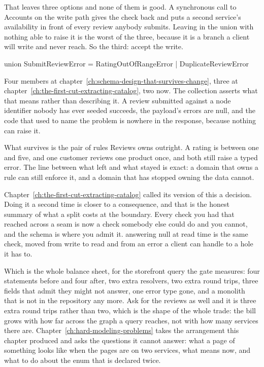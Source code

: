 That leaves three options and none of them is good. A synchronous call to
Accounts on the write path gives the check back and puts a second service's
availability in front of every review anybody submits. Leaving
 in the union with nothing able to raise it is the
worst of the three, because it is a branch a client will write and never reach.
So the third: accept the write.

\begin{graphqlsdl}[fontsize=\footnotesize]
union SubmitReviewError = RatingOutOfRangeError | DuplicateReviewError
\end{graphqlsdl}

Four members at chapter~\ref{ch:schema-design-that-survives-change}, three at
chapter~\ref{ch:the-first-cut-extracting-catalog}, two now. The collection asserts
what that means rather than describing it. A review submitted against a
 node identifier nobody has ever seeded succeeds, the payload's
errors are null, and the code that used to name the problem is nowhere in the
response, because nothing can raise it.

%
What survives is the pair of rules Reviews owns outright. A rating is between
one and five, and one customer reviews one product once, and both still raise a
typed error. The line between what left and what stayed is exact: a domain that
owns a rule can still enforce it, and a domain that has stopped owning the data
cannot.

Chapter~\ref{ch:the-first-cut-extracting-catalog} called its version of this a
decision. Doing it a second time is
closer to a consequence, and that is the honest summary of what a split costs at
the boundary. Every check you had that reached across a seam is now a check
somebody else could do and you cannot, and the schema is where you admit it.
 answering null at read time is the same check, moved from
write to read and from an error a client can handle to a hole it has to.

\medskip
Which is the whole balance sheet, for the storefront query the gate measures:
four statements before and four after, two extra resolvers, two extra round
trips, three fields that admit they might not answer, one error type gone, and a
monolith that is not in the repository any more. Ask for the reviews as well and
it is three extra round trips rather than two, which is the shape of the whole
trade: the bill grows with how far across the graph a query reaches, not with
how many services there are. Chapter~\ref{ch:hard-modeling-problems} takes the arrangement this
chapter produced and asks the questions it cannot answer: what a page of
something looks like when the pages are on two services, what 
means now, and what to do about the enum that is declared twice.

%
